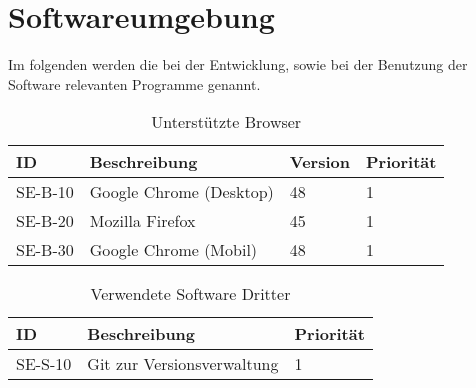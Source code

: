 
\chapter{Softwareumgebung}
Im folgenden werden die bei der Entwicklung, sowie bei der Benutzung der Software relevanten Programme genannt.



\begin{table}[H]
\caption{Unterstützte Browser}
\label{softwareumgebung:browser}
\begin{tabularx}{\textwidth}{|l|l|l|l|}
\toprule
\textbf{ID} & \textbf{Beschreibung} & \textbf{Version} & \textbf{Priorität}\\
\endhead
\hline
SE-B-10 & Google Chrome (Desktop) & 48 & 1 \\
SE-B-20 & Mozilla Firefox & 45 & 1 \\
SE-B-30 & Google Chrome (Mobil) & 48 & 1\\
\hline
\end{tabularx}
\end{table}

\begin{table}[H]
\caption{Verwendete Software Dritter}
\label{softwareumgebung:sonstige}
\begin{tabularx}{\textwidth}{|l|X|l|}
\toprule
\textbf{ID} & \textbf{Beschreibung} & \textbf{Priorität}\\
\endhead
\hline
SE-S-10 & Git zur Versionsverwaltung & 1 \\
\hline
\end{tabularx}
\end{table}
